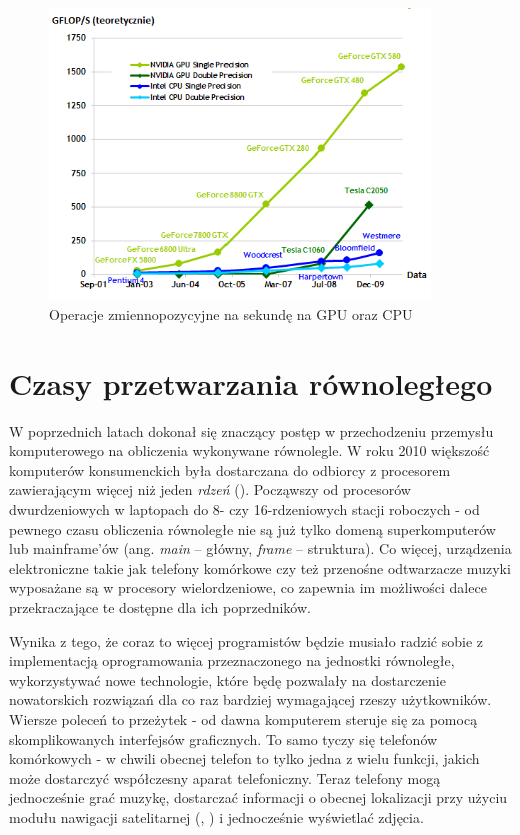 \begin{figure}[ht]
\centering\includegraphics[width=0.9\textwidth]{figures/03/gpu_cpu2.png}
\caption{Operacje zmiennopozycyjne na sekundę na GPU oraz CPU~\cite{Cuda:PGuide}}\label{rys:gpu_cpu2}
\end{figure}

\section{Czasy przetwarzania równoległego}
W poprzednich latach dokonał się znaczący postęp w przechodzeniu przemysłu komputerowego na obliczenia wykonywane równolegle. W roku 2010 większość komputerów konsumenckich była dostarczana do odbiorcy z procesorem zawierającym więcej niż jeden \emph{rdzeń} (). Począwszy od procesorów dwurdzeniowych w laptopach do 8- czy 16-rdzeniowych stacji roboczych - od pewnego czasu obliczenia równoległe nie są już tylko domeną superkomputerów lub mainframe'ów (ang. \emph{main} – główny, \emph{frame} – struktura). Co więcej, urządzenia elektroniczne takie jak telefony komórkowe czy też przenośne odtwarzacze muzyki wyposażane są w procesory wielordzeniowe, co zapewnia im możliwości dalece przekraczające te dostępne dla ich poprzedników.

Wynika z tego, że coraz to więcej programistów będzie musiało radzić sobie z implementacją oprogramowania przeznaczonego na jednostki równoległe, wykorzystywać nowe technologie, które będę pozwalały na dostarczenie nowatorskich rozwiązań dla co raz bardziej wymagającej rzeszy użytkowników. Wiersze poleceń to przeżytek - od dawna komputerem steruje się za pomocą skomplikowanych interfejsów graficznych. To samo tyczy się telefonów komórkowych - w chwili obecnej telefon to tylko jedna z wielu funkcji, jakich może dostarczyć współczesny aparat telefoniczny. Teraz telefony mogą jednocześnie grać muzykę, dostarczać informacji o obecnej lokalizacji przy użyciu modułu nawigacji satelitarnej (, ) i jednocześnie wyświetlać zdjęcia.

